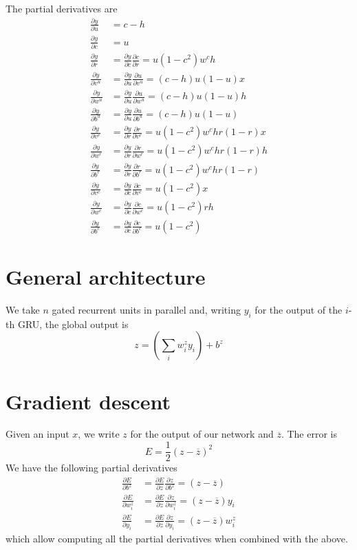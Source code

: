 \documentclass[a4paper]{article}
\newcommand{\pa}[1]{\left(#1\right)}
\newcommand{\ol}{\overline}
\begin{document}
The partial derivatives are
\begin{align*}
  \frac{\partial y}{\partial u}&=c-h\\
  \frac{\partial y}{\partial c}&=u\\
  \frac{\partial y}{\partial r}&=\frac{\partial y}{\partial c}\frac{\partial c}{\partial r}=u(1-c^2)w^ch\\
  \frac{\partial y}{\partial v^u}&=\frac{\partial y}{\partial u}\frac{\partial u}{\partial v^u}=(c-h)u(1-u)x\\
  \frac{\partial y}{\partial w^u}&=\frac{\partial y}{\partial u}\frac{\partial u}{\partial w^u}=(c-h)u(1-u)h\\
  \frac{\partial y}{\partial b^u}&=\frac{\partial y}{\partial u}\frac{\partial u}{\partial b^u}=(c-h)u(1-u)\\
  \frac{\partial y}{\partial v^r}&=\frac{\partial y}{\partial r}\frac{\partial r}{\partial v^r}=u(1-c^2)w^chr(1-r)x\\
  \frac{\partial y}{\partial w^r}&=\frac{\partial y}{\partial r}\frac{\partial r}{\partial w^r}=u(1-c^2)w^chr(1-r)h\\
  \frac{\partial y}{\partial b^r}&=\frac{\partial y}{\partial r}\frac{\partial r}{\partial b^r}=u(1-c^2)w^chr(1-r)\\
  \frac{\partial y}{\partial v^c}&=\frac{\partial y}{\partial c}\frac{\partial c}{\partial v^c}=u(1-c^2)x\\
  \frac{\partial y}{\partial w^c}&=\frac{\partial y}{\partial c}\frac{\partial c}{\partial w^c}=u(1-c^2)rh\\
  \frac{\partial y}{\partial b^c}&=\frac{\partial y}{\partial c}\frac{\partial c}{\partial b^c}=u(1-c^2)
\end{align*}

\section{General architecture}
We take $n$ gated recurrent units in parallel and, writing $y_i$ for the output
of the $i$-th GRU, the global output is
\[
  z=\pa{\sum_iw^z_iy_i}+b^z
\]

\section{Gradient descent}
Given an input $x$, we write $z$ for the output of our network and $\ol z$. The error is
\[
  E=\frac 12(z-\ol z)^2
\]
We have the following partial derivatives
\begin{align*}
  \frac{\partial E}{\partial b^z}&=\frac{\partial E}{\partial z}\frac{\partial z}{\partial b^z}=(z-\ol z)\\
  \frac{\partial E}{\partial w_i^z}&=\frac{\partial E}{\partial z}\frac{\partial z}{\partial w_i^z}=(z-\ol z)y_i\\
  \frac{\partial E}{\partial y_i}&=\frac{\partial E}{\partial z}\frac{\partial z}{\partial y_i}=(z-\ol z)w_i^z
\end{align*}
which allow computing all the partial derivatives when combined with the above.



\end{document}
